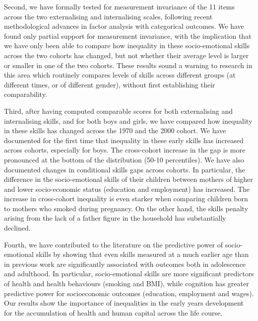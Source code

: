 Second, we have formally tested for measurement invariance of the 11 items across the two externalising and internalising scales, following recent methodological advances in factor analysis with categorical outcomes. We have found only partial support for measurement invariance, with the implication that we have only been able to compare how inequality in these socio-emotional skills across the two cohorts has changed, but not whether their average level is larger or smaller in one of the two cohorts. These results sound a warning to research in this area which routinely compares levels of skills across different groups (at different times, or of different gender), without first establishing their comparability.

Third, after having computed comparable scores for both externalising and internalising skills, and for both boys and girls, we have compared how inequality in these skills has changed across the 1970 and the 2000 cohort. We have documented for the first time that inequality in these early skills has increased across cohorts, especially for boys. The cross-cohort increase in the gap is more pronounced at the bottom of the distribution (50-10 percentiles). We have also documented changes in conditional skills gaps across cohorts. In particular, the difference in the socio-emotional skills of their children between mothers of higher and lower socio-economic status (education and employment) has increased. The increase in cross-cohort inequality is even starker when comparing children born to mothers who smoked during pregnancy. On the other hand, the skills penalty arising from the lack of a father figure in the household has substantially declined.

Fourth, we have contributed to the literature on the predictive power of socio-emotional skills by showing that even skills measured at a much earlier age than in previous work are significantly associated with outcomes both in adolescence and adulthood. In particular, socio-emotional skills are more significant predictors of health and health behaviours (smoking and BMI), while cognition has greater predictive power for socioeconomic outcomes (education, employment and wages). Our results show the importance of inequalities in the early years development for the accumulation of health and human capital across the life course. 
